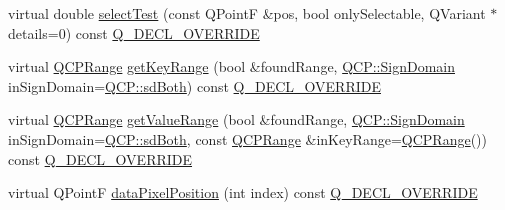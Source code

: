 \begin{DoxyCompactItemize}
\item 
virtual double \mbox{\hyperlink{class_q_c_p_bars_a121f899c27af3186fe93dcd0eb98f49b}{select\+Test}} (const Q\+PointF \&pos, bool only\+Selectable, Q\+Variant $\ast$details=0) const \mbox{\hyperlink{qcustomplot_8h_a42cc5eaeb25b85f8b52d2a4b94c56f55}{Q\+\_\+\+D\+E\+C\+L\+\_\+\+O\+V\+E\+R\+R\+I\+DE}}
\item 
virtual \mbox{\hyperlink{class_q_c_p_range}{Q\+C\+P\+Range}} \mbox{\hyperlink{class_q_c_p_bars_ac5a3854774d9d9cd129b1eae1426de2d}{get\+Key\+Range}} (bool \&found\+Range, \mbox{\hyperlink{namespace_q_c_p_afd50e7cf431af385614987d8553ff8a9}{Q\+C\+P\+::\+Sign\+Domain}} in\+Sign\+Domain=\mbox{\hyperlink{namespace_q_c_p_afd50e7cf431af385614987d8553ff8a9aa38352ef02d51ddfa4399d9551566e24}{Q\+C\+P\+::sd\+Both}}) const \mbox{\hyperlink{qcustomplot_8h_a42cc5eaeb25b85f8b52d2a4b94c56f55}{Q\+\_\+\+D\+E\+C\+L\+\_\+\+O\+V\+E\+R\+R\+I\+DE}}
\item 
virtual \mbox{\hyperlink{class_q_c_p_range}{Q\+C\+P\+Range}} \mbox{\hyperlink{class_q_c_p_bars_a02cee4bf94d48a1e5f6fc185d9a10477}{get\+Value\+Range}} (bool \&found\+Range, \mbox{\hyperlink{namespace_q_c_p_afd50e7cf431af385614987d8553ff8a9}{Q\+C\+P\+::\+Sign\+Domain}} in\+Sign\+Domain=\mbox{\hyperlink{namespace_q_c_p_afd50e7cf431af385614987d8553ff8a9aa38352ef02d51ddfa4399d9551566e24}{Q\+C\+P\+::sd\+Both}}, const \mbox{\hyperlink{class_q_c_p_range}{Q\+C\+P\+Range}} \&in\+Key\+Range=\mbox{\hyperlink{class_q_c_p_range}{Q\+C\+P\+Range}}()) const \mbox{\hyperlink{qcustomplot_8h_a42cc5eaeb25b85f8b52d2a4b94c56f55}{Q\+\_\+\+D\+E\+C\+L\+\_\+\+O\+V\+E\+R\+R\+I\+DE}}
\item 
virtual Q\+PointF \mbox{\hyperlink{class_q_c_p_bars_a55cdaf565cd3384158d1f7f89533bc2d}{data\+Pixel\+Position}} (int index) const \mbox{\hyperlink{qcustomplot_8h_a42cc5eaeb25b85f8b52d2a4b94c56f55}{Q\+\_\+\+D\+E\+C\+L\+\_\+\+O\+V\+E\+R\+R\+I\+DE}}
\end{DoxyCompactItemize}
